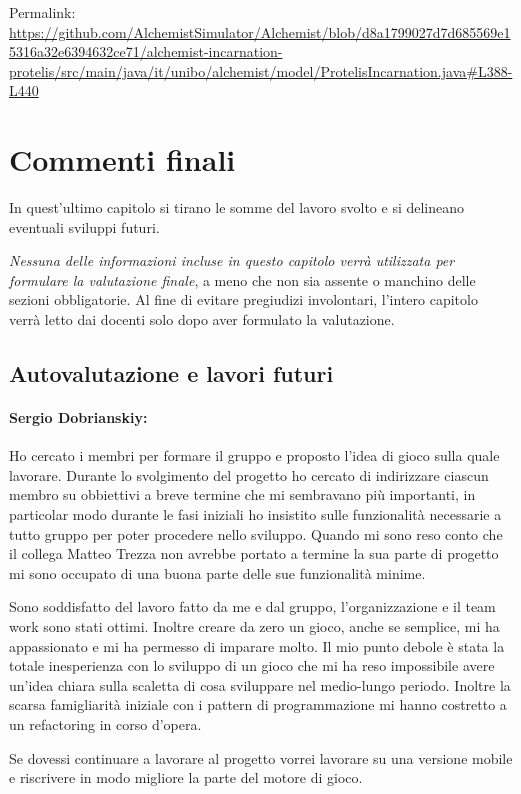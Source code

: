 \documentclass[a4paper,12pt]{report}
\begin{document}
Permalink: \url{https://github.com/AlchemistSimulator/Alchemist/blob/d8a1799027d7d685569e15316a32e6394632ce71/alchemist-incarnation-protelis/src/main/java/it/unibo/alchemist/model/ProtelisIncarnation.java#L388-L440}


\chapter{Commenti finali}

In quest'ultimo capitolo si tirano le somme del lavoro svolto e si delineano eventuali sviluppi
futuri.

\textit{Nessuna delle informazioni incluse in questo capitolo verrà utilizzata per formulare la valutazione finale}, a meno che non sia assente o manchino delle sezioni obbligatorie.
%
Al fine di evitare pregiudizi involontari, l'intero capitolo verrà letto dai docenti solo dopo aver formulato la valutazione.

\section{Autovalutazione e lavori futuri}
\subsubsection*{Sergio Dobrianskiy:}

Ho  cercato i membri per formare il gruppo e proposto l'idea di gioco sulla quale lavorare.
Durante lo svolgimento del progetto ho cercato di indirizzare ciascun membro su obbiettivi a breve termine che mi sembravano più importanti, in particolar modo durante le fasi iniziali ho insistito sulle funzionalità necessarie a tutto gruppo per poter procedere nello sviluppo. 
Quando mi sono reso conto che il collega Matteo Trezza non avrebbe portato a termine la sua parte di progetto mi sono occupato di una buona parte delle sue funzionalità minime.

Sono soddisfatto del lavoro fatto da me e dal gruppo, l'organizzazione e il team work sono stati ottimi. Inoltre creare da zero un gioco, anche se semplice, mi ha appassionato e mi ha permesso di imparare molto.
Il mio punto debole è stata la totale inesperienza con lo sviluppo di un gioco che mi ha reso impossibile avere un'idea chiara sulla scaletta di cosa sviluppare nel medio-lungo periodo. Inoltre la scarsa famigliarità iniziale con i pattern di programmazione mi hanno costretto a un refactoring in corso d'opera. 

Se dovessi continuare a lavorare al progetto vorrei lavorare su una versione mobile e riscrivere in modo migliore la parte del motore di gioco.
\end{document}
